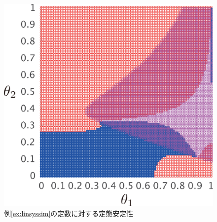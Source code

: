 \documentclass[tombow,dvipdfmx]{corona-a5-1.1}
\begin{document}
\begin{figure}[t]
{\begin{minipage}{0.32\linewidth}
    \centering
    \includegraphics[width = .85\linewidth]{figs/gam5thm}
  \end{minipage}
  \caption{例\ref{ex:linsyssim}の定数に対する定態安定性}
  \label{fig:gamthm}
  }
\end{figure}
\end{document}
